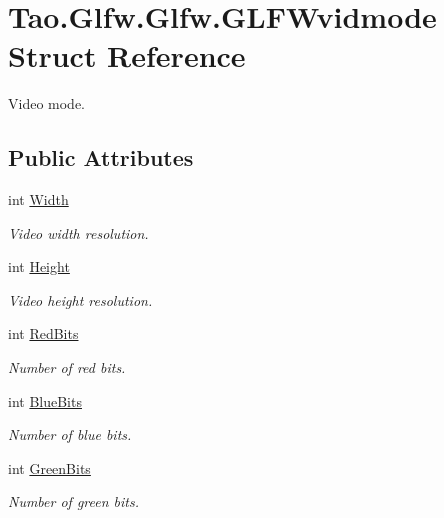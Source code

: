 \hypertarget{struct_tao_1_1_glfw_1_1_glfw_1_1_g_l_f_wvidmode}{
\section{Tao.Glfw.Glfw.GLFWvidmode Struct Reference}
\label{struct_tao_1_1_glfw_1_1_glfw_1_1_g_l_f_wvidmode}
}


Video mode.  


\subsection*{Public Attributes}
\begin{DoxyCompactItemize}
\item 
int \hyperlink{struct_tao_1_1_glfw_1_1_glfw_1_1_g_l_f_wvidmode_a7fdfa1ceaf3bfbf0e696989713b49586}{Width}
\begin{DoxyCompactList}\small\item\em Video width resolution. \item\end{DoxyCompactList}\item 
int \hyperlink{struct_tao_1_1_glfw_1_1_glfw_1_1_g_l_f_wvidmode_a2a0bbd1e7e025047b9b9a80f08d53891}{Height}
\begin{DoxyCompactList}\small\item\em Video height resolution. \item\end{DoxyCompactList}\item 
int \hyperlink{struct_tao_1_1_glfw_1_1_glfw_1_1_g_l_f_wvidmode_a384d6f163e550ef68a91b33eaa09507a}{RedBits}
\begin{DoxyCompactList}\small\item\em Number of red bits. \item\end{DoxyCompactList}\item 
int \hyperlink{struct_tao_1_1_glfw_1_1_glfw_1_1_g_l_f_wvidmode_a6482092dfb6f076554afbda69d139089}{BlueBits}
\begin{DoxyCompactList}\small\item\em Number of blue bits. \item\end{DoxyCompactList}\item 
int \hyperlink{struct_tao_1_1_glfw_1_1_glfw_1_1_g_l_f_wvidmode_a409d6bf153259847ca2f3ee30d2e4886}{GreenBits}
\begin{DoxyCompactList}\small\item\em Number of green bits. \item\end{DoxyCompactList}\end{DoxyCompactItemize}


